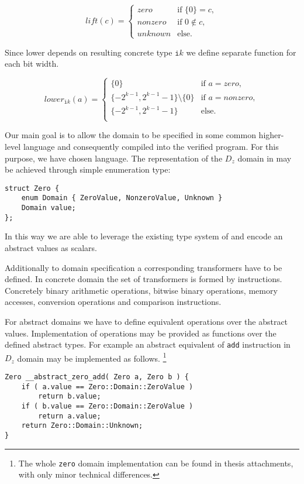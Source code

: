 \[
  lift(c) =
  \begin{cases}
    \textit{zero}    & \text{if } \{0\} = c, \\
    \textit{nonzero} & \text{if } 0 \not \in c, \\
    \textit{unknown} & \text{else.}
  \end{cases}
\]

\noindent
Since lower depends on resulting concrete type $\texttt{i}k$ we define separate
function for each bit width.

\[
  lower_{\texttt{i}k}(a) =
  \begin{cases}
    \{0\}    & \text{if } a = \textit{zero},\\
    \{-2^{k-1}, 2^{k - 1} - 1\} \setminus \{0\} & \text{if } a = \textit{nonzero}, \\
    \{-2^{k-1}, 2^{k - 1} - 1\} & \text{else}. \\
  \end{cases}
\]

Our main goal is to allow the domain to be specified in some common higher-level
language and consequently compiled into the verified program. For this purpose,
we have chosen \Cpp{} language. The representation of the $D_z$ domain in
\Cpp{} may be achieved through simple enumeration type:
\begin{verbatim}
struct Zero {
    enum Domain { ZeroValue, NonzeroValue, Unknown }
    Domain value;
};
\end{verbatim}
In this way we are able to leverage the existing type system of \LLVM and
encode an abstract values as \LLVM scalars.

Additionally to domain specification a corresponding transformers have to be
defined. In concrete domain the set of transformers is formed by \LLVM
instructions. Concretely binary arithmetic operations, bitwise binary
operations, memory accesses, conversion operations and comparison instructions.

For abstract domains we have to define equivalent operations over the abstract
values. Implementation of operations may be provided as \Cpp{} functions over
the defined abstract types. For example an abstract equivalent of \texttt{add}
instruction in $D_z$ domain may be implemented as follows. \footnote{The whole
\texttt{zero} domain implementation can be found in thesis attachments, with
only minor technical differences.}
\begin{verbatim}
Zero __abstract_zero_add( Zero a, Zero b ) {
    if ( a.value == Zero::Domain::ZeroValue )
        return b.value;
    if ( b.value == Zero::Domain::ZeroValue )
        return a.value;
    return Zero::Domain::Unknown;
}
\end{verbatim}

